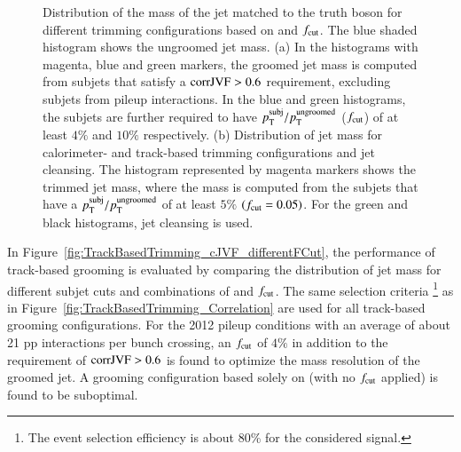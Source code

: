 \documentclass{atlasnote}
\begin{document}
\begin{figure}[!htbp]
  \centering
  \caption{Distribution of the mass of the jet matched to the truth \Zboson boson for different trimming configurations based on \cJVF and $f_{\rm cut}$. 
The blue shaded histogram shows the ungroomed jet mass. (a) In the histograms with magenta, blue and green markers, 
the groomed jet mass is computed from subjets that satisfy 
a ${\rm corrJVF} > 0.6$ requirement, \ie excluding subjets from pileup interactions. 
In the blue and green histograms, the subjets are further required to have $p_{\mathrm{T}}^{\rm subj} / p_{\mathrm{T}}^{\rm ungroomed}$  ($f_{\rm cut}$) of at 
least $4\%$ and $10\%$ respectively. (b) Distribution of jet mass for calorimeter- and track-based trimming configurations and
jet cleansing. The histogram represented by magenta markers shows the trimmed jet mass, where the mass is computed from the subjets that 
have a $p_{\mathrm{T}}^{\rm subj} / p_{\mathrm{T}}^{\rm ungroomed}$ of at least $5\%$ $(f_{\rm cut} = 0.05)$. 
For the green and black histograms, jet cleansing is used.}
\label{fig:Trimming}
\end{figure}

In Figure~\ref{fig:TrackBasedTrimming_cJVF_differentFCut}, the performance of track-based grooming is evaluated by 
comparing the distribution of jet mass for different subjet \cJVF cuts and combinations of \cJVF and $f_{\rm cut}$. 
The same selection criteria%
\footnote{The event selection efficiency is about 80\% for the considered signal.}
as in Figure~\ref{fig:TrackBasedTrimming_Correlation} are used for all track-based grooming configurations. 
For the 2012 pileup conditions with an average of about 21 pp interactions per bunch crossing, 
an $f_{\rm cut}$ of $4\%$ in addition to the requirement of ${\rm corrJVF}>0.6$ is found to optimize the mass resolution of the groomed jet. 
A grooming configuration based solely on \cJVF (with no $f_{\rm cut}$ applied) is found to be suboptimal. 
\end{document}
